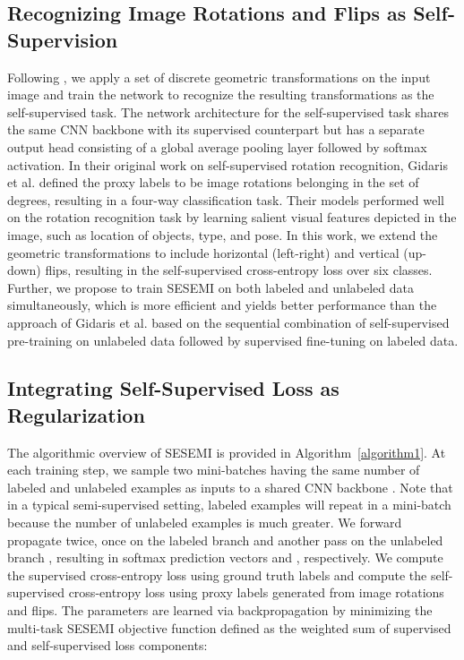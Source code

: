 \documentclass{article}
\begin{document}
\subsection{Recognizing Image Rotations and Flips as Self-Supervision}
Following \cite{rotations}, we apply a set of discrete geometric transformations on the input image and train the network to recognize the resulting transformations as the self-supervised task. The network architecture for the self-supervised task shares the same CNN backbone with its supervised counterpart but has a separate output head consisting of a global average pooling layer followed by softmax activation. In their original work on self-supervised rotation recognition, Gidaris et al. \cite{rotations} defined the proxy labels to be image rotations belonging in the set of  degrees, resulting in a four-way classification task. Their models performed well on the rotation recognition task by learning salient visual features depicted in the image, such as location of objects, type, and pose. In this work, we extend the geometric transformations to include horizontal (left-right) and vertical (up-down) flips, resulting in the self-supervised cross-entropy loss over six classes. Further, we propose to train SESEMI on both labeled and unlabeled data simultaneously, which is more efficient and yields better performance than the approach of Gidaris et al. based on the sequential combination of self-supervised pre-training on unlabeled data followed by supervised fine-tuning on labeled data.

\subsection{Integrating Self-Supervised Loss as Regularization}
The algorithmic overview of SESEMI is provided in Algorithm~\ref{algorithm1}. At each training step, we sample two mini-batches having the same number of labeled and unlabeled examples as inputs to a shared CNN backbone . Note that in a typical semi-supervised setting, labeled examples will repeat in a mini-batch because the number of unlabeled examples is much greater. We forward propagate  twice, once on the labeled branch  and another pass on the unlabeled branch , resulting in softmax prediction vectors  and , respectively. We compute the supervised cross-entropy loss  using ground truth labels  and compute the self-supervised cross-entropy loss  using proxy labels  generated from image rotations and flips. The parameters  are learned via backpropagation by minimizing the multi-task SESEMI objective function defined as the weighted sum of supervised and self-supervised loss components:
\end{document}

